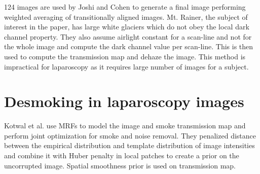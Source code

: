 124 images are used by Joshi and Cohen \cite{joshi2010multi} to generate a final image performing weighted averaging of transitionally aligned images. Mt. Rainer, the subject of interest in the paper, has large white glaciers which do not obey the local dark channel property. They also assume airlight constant for a scan-line and not for the whole image and compute the dark channel value per scan-line. This is then used to compute the transmission map and dehaze the image. This method is impractical for laparoscopy as it requires large number of images for a subject. 




\section{Desmoking in laparoscopy images}
Kotwal et al. \cite{kotwal2016joint} use MRFs to model the image and smoke transmission map and perform joint optimization for smoke and noise removal. They penalized distance between the empirical distribution and template distribution of image intensities and combine it with Huber penalty in local patches to create a prior on the uncorrupted image. Spatial smoothness prior is used on transmission map.












